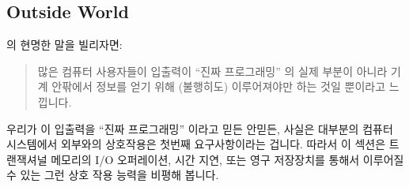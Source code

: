 \subsection{Outside World}
\label{sec:future:Outside World}

 의 현명한 말을 빌리자면:

\begin{quote}
	많은 컴퓨터 사용자들이 입출력이 ``진짜 프로그래밍'' 의 실제 부분이
	아니라 기계 안팎에서 정보를 얻기 위해 (불행히도) 이루어져야만 하는 것일
	뿐이라고 느낍니다.

\end{quote}

우리가 이 입출력을 ``진짜 프로그래밍'' 이라고 믿든 안믿든, 사실은 대부분의
컴퓨터 시스템에서 외부와의 상호작용은 첫번째 요구사항이라는 겁니다.
따라서 이 섹션은 트랜잭셔널 메모리의 I/O 오퍼레이션, 시간 지연, 또는 영구
저장장치를 통해서 이루어질 수 있는 그런 상호 작용 능력을 비평해 봅니다.


